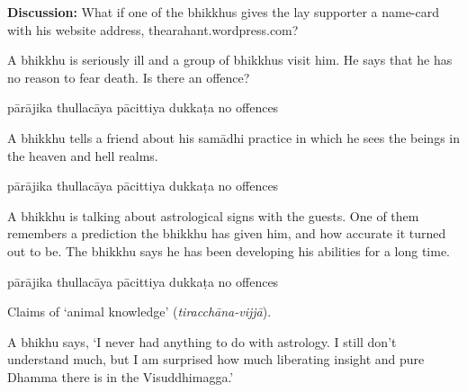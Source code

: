 \begin{exam}{\autoExamName}
\begin{problem*}
\begin{parts}
  \bigskip

  \textbf{Discussion:} What if one of the bhikkhus gives the lay supporter a
  name-card with his website address, thearahant.wordpress.com?

  \bigskip

\item A bhikkhu is seriously ill and a group of bhikkhus visit him. He says that
  he has no reason to fear death. Is there an offence?

  \bigskip

  \begin{answers}{5}
    \bChoices
     pārājika\eAns
     thullacāya\eAns
     pācittiya\eAns
     dukkaṭa\eAns
     no offences\eAns
    \eChoices
  \end{answers}

  \bigskip

\item A bhikkhu tells a friend about his samādhi practice in which he sees the
  beings in the heaven and hell realms.

  \bigskip

  \begin{answers}{5}
    \bChoices
     pārājika\eAns
     thullacāya\eAns
     pācittiya\eAns
     dukkaṭa\eAns
     no offences\eAns
    \eChoices
  \end{answers}

  \bigskip

\item A bhikkhu is talking about astrological signs with the guests. One of them
  remembers a prediction the bhikkhu has given him, and how accurate it turned
  out to be. The bhikkhu says he has been developing his abilities for a long time.

  \bigskip

  \begin{answers}{5}
    \bChoices
     pārājika\eAns
     thullacāya\eAns
     pācittiya\eAns
     dukkaṭa\eAns
     no offences\eAns
    \eChoices
  \end{answers}

  \begin{solution}
    Claims of `animal knowledge' (\emph{tiracchāna-vijjā}).
  \end{solution}

  \bigskip

\item A bhikhu says, `I never had anything to do with astrology.
  I still don't understand much, but I am surprised how much liberating insight
  and pure Dhamma there is in the Visuddhimagga.'


\end{parts}
\end{problem*}
\end{exam}
